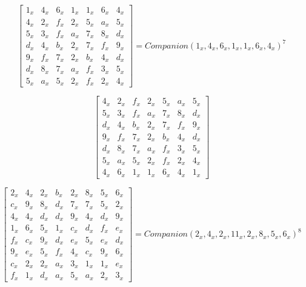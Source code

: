 \begin{equation}\label{mat:photon_a196}
  \begin{bmatrix}
  1_x & 4_x & 6_x & 1_x & 1_x & 6_x & 4_x\\
  4_x & 2_x & f_x & 2_x & 5_x & a_x & 5_x\\
  5_x & 3_x & f_x & a_x & 7_x & 8_x & d_x\\
  d_x & 4_x & b_x & 2_x & 7_x & f_x & 9_x\\
  9_x & f_x & 7_x & 2_x & b_x & 4_x & d_x\\
  d_x & 8_x & 7_x & a_x & f_x & 3_x & 5_x\\
  5_x & a_x & 5_x & 2_x & f_x & 2_x & 4_x
  \end{bmatrix}
  =
  Companion(1_x,4_x,6_x,1_x,1_x,6_x,4_x)^7
\end{equation}

\begin{equation}\label{mat:photon_a196-inv}
  \begin{bmatrix}
  4_x & 2_x & f_x & 2_x & 5_x & a_x & 5_x\\
  5_x & 3_x & f_x & a_x & 7_x & 8_x & d_x\\
  d_x & 4_x & b_x & 2_x & 7_x & f_x & 9_x\\
  9_x & f_x & 7_x & 2_x & b_x & 4_x & d_x\\
  d_x & 8_x & 7_x & a_x & f_x & 3_x & 5_x\\
  5_x & a_x & 5_x & 2_x & f_x & 2_x & 4_x\\
  4_x & 6_x & 1_x & 1_x & 6_x & 4_x & 1_x
  \end{bmatrix}
\end{equation}

\begin{equation}\label{mat:photon_a256}
  \begin{bmatrix}
  2_x & 4_x & 2_x & b_x & 2_x & 8_x & 5_x & 6_x\\
  c_x & 9_x & 8_x & d_x & 7_x & 7_x & 5_x & 2_x\\
  4_x & 4_x & d_x & d_x & 9_x & 4_x & d_x & 9_x\\
  1_x & 6_x & 5_x & 1_x & c_x & d_x & f_x & e_x\\
  f_x & c_x & 9_x & d_x & e_x & 5_x & e_x & d_x\\
  9_x & e_x & 5_x & f_x & 4_x & c_x & 9_x & 6_x\\
  c_x & 2_x & 2_x & a_x & 3_x & 1_x & 1_x & e_x\\
  f_x & 1_x & d_x & a_x & 5_x & a_x & 2_x & 3_x
  \end{bmatrix}
  =
  Companion(2_x,4_x,2_x,11_x,2_x,8_x,5_x,6_x)^8
\end{equation}

